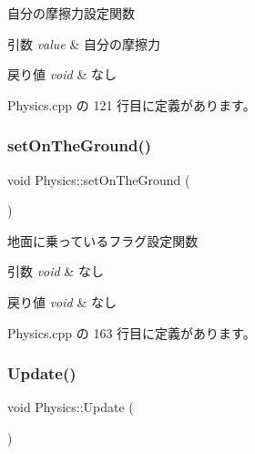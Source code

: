 自分の摩擦力設定関数 


\begin{DoxyParams}{引数}
{\em value} & 自分の摩擦力 \\
\hline
\end{DoxyParams}

\begin{DoxyRetVals}{戻り値}
{\em void} & なし \\
\hline
\end{DoxyRetVals}


 Physics.\+cpp の 121 行目に定義があります。

\mbox{\label{class_physics_aad378ed29224e1bc00fd08ddc6122478}} 
\subsubsection{\texorpdfstring{set\+On\+The\+Ground()}{setOnTheGround()}}
{\footnotesize\ttfamily void Physics\+::set\+On\+The\+Ground (\begin{DoxyParamCaption}{ }\end{DoxyParamCaption})}



地面に乗っているフラグ設定関数 


\begin{DoxyParams}{引数}
{\em void} & なし \\
\hline
\end{DoxyParams}

\begin{DoxyRetVals}{戻り値}
{\em void} & なし \\
\hline
\end{DoxyRetVals}


 Physics.\+cpp の 163 行目に定義があります。

\mbox{\label{class_physics_a13bf3e9de07a12afc3c0a4012e00d0a1}} 
\subsubsection{\texorpdfstring{Update()}{Update()}}
{\footnotesize\ttfamily void Physics\+::\+Update (\begin{DoxyParamCaption}{ }\end{DoxyParamCaption})}



